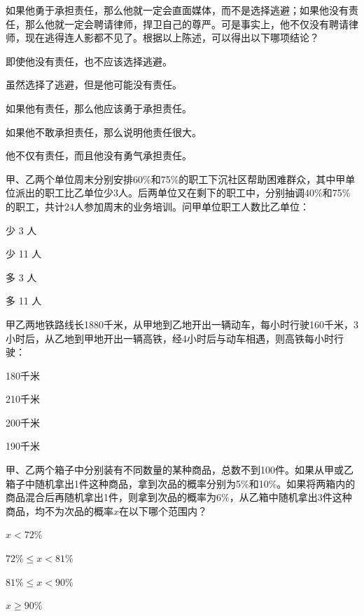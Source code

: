 \documentclass{exam-zh}
\begin{document}
\begin{question}
  如果他勇于承担责任，那么他就一定会直面媒体，而不是选择逃避；如果他没有责任，那么他就一定会聘请律师，捍卫自己的尊严。可是事实上，他不仅没有聘请律师，现在逃得连人影都不见了。根据以上陈述，可以得出以下哪项结论？ \paren

  \begin{choices}
    \item 即使他没有责任，也不应该选择逃避。
    \item 虽然选择了逃避，但是他可能没有责任。
    \item 如果他有责任，那么他应该勇于承担责任。
    \item 如果他不敢承担责任，那么说明他责任很大。
    \item 他不仅有责任，而且他没有勇气承担责任。
  \end{choices}
\end{question}

\begin{question}
  甲、乙两个单位周末分别安排60\%和75\%的职工下沉社区帮助困难群众，其中甲单位派出的职工比乙单位少3人。后两单位又在剩下的职工中，分别抽调40\%和75\%的职工，共计24人参加周末的业务培训。问甲单位职工人数比乙单位： \paren

  \begin{choices}
    \item 少 3 人
    \item 少 11 人
    \item 多 3 人
    \item 多 11 人
  \end{choices}
\end{question}

\begin{question}
  甲乙两地铁路线长1880千米，从甲地到乙地开出一辆动车，每小时行驶160千米，3小时后，从乙地到甲地开出一辆高铁，经4小时后与动车相遇，则高铁每小时行驶： \paren

  \begin{choices}
    \item 180千米
    \item 210千米
    \item 200千米
    \item 190千米
  \end{choices}
\end{question}

\begin{question}
  甲、乙两个箱子中分别装有不同数量的某种商品，总数不到100件。如果从甲或乙箱子中随机拿出1件这种商品，拿到次品的概率分别为5\%和10\%。如果将两箱内的商品混合后再随机拿出1件，则拿到次品的概率为6\%，从乙箱中随机拿出3件这种商品，均不为次品的概率$x$在以下哪个范围内？ \paren

  \begin{choices}
    \item $x < 72\%$
    \item $72\% \le x < 81\%$
    \item $81\% \le x < 90\%$
    \item $x \ge 90\%$
  \end{choices}
\end{question}
\end{document}
